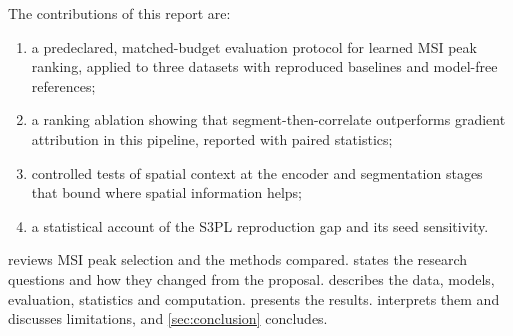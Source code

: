 The contributions of this report are:
\begin{enumerate}
  \item a predeclared, matched-budget evaluation protocol for learned MSI peak
        ranking, applied to three datasets with reproduced baselines and
        model-free references;
  \item a ranking ablation showing that segment-then-correlate outperforms
        gradient attribution in this pipeline, reported with paired statistics;
  \item controlled tests of spatial context at the encoder and segmentation
        stages that bound where spatial information helps;
  \item a statistical account of the S3PL reproduction gap and its seed
        sensitivity.
\end{enumerate}

 reviews MSI peak selection and the methods compared.
 states the research questions and how they changed from
the proposal.  describes the data, models, evaluation,
statistics and computation.  presents the results.
 interprets them and discusses limitations, and
\cref{sec:conclusion} concludes.
